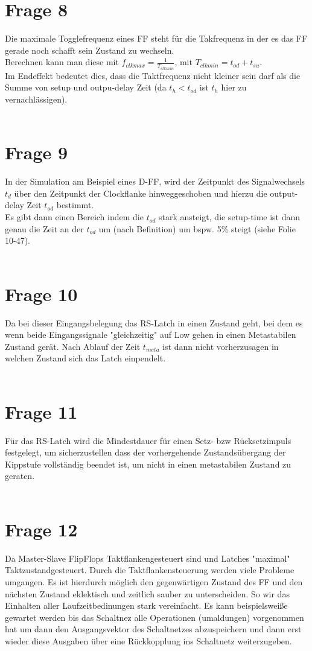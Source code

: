 \documentclass[a4paper]{scrartcl}
\begin{document}
\section*{Frage 8}
Die maximale Togglefrequenz eines FF steht für die Takfrequenz in der es das FF gerade noch schafft sein Zustand zu wechseln.\\
Berechnen kann man diese mit $f_{clkmax} = \frac{1}{T_{clkmin}} \text{, mit }T_{clkmin} = t_{od} + t_{su}$.\\
Im Endeffekt bedeutet dies, dass die Taktfrequenz nicht kleiner sein darf als die Summe von setup und outpu-delay Zeit (da $t_{h} < t_{od}$ ist $t_h$ hier zu vernachlässigen). 
~\\
~\\
\section*{Frage 9}
In der Simulation am Beispiel eines D-FF, wird der Zeitpunkt des Signalwechsels $t_d$ über den Zeitpunkt der Clockflanke hinweggeschoben und hierzu die output-delay Zeit $t_{od}$ bestimmt.\\
Es gibt dann einen Bereich indem die $t_{od}$ stark ansteigt, die setup-time ist dann genau die Zeit an der $t_{od}$ um (nach Befinition) um bspw. 5\% steigt (siehe Folie 10-47).
~\\
~\\
\section*{Frage 10}
Da bei dieser Eingangsbelegung das RS-Latch in einen Zustand geht, bei dem es wenn beide Eingangssignale "gleichzeitig" auf Low gehen in einen Metastabilen Zustand gerät. Nach Ablauf der Zeit $t_{meta}$ ist dann nicht vorherzusagen in welchen Zustand sich das Latch einpendelt.
~\\
~\\
\section*{Frage 11}
Für das RS-Latch wird die Mindestdauer für einen Setz- bzw Rücksetzimpuls festgelegt, um sicherzustellen dass der vorhergehende Zustandsübergang der Kippstufe vollständig beendet ist, um nicht in einen metastabilen Zustand zu geraten.
~\\
~\\
\section*{Frage 12}
Da Master-Slave FlipFlops Taktflankengesteuert sind und Latches "maximal" Taktzustandgesteuert. Durch die Taktflankensteuerung werden viele Probleme umgangen. Es ist hierdurch möglich den gegenwärtigen Zustand des FF und den nächsten Zustand eklektisch und zeitlich sauber zu unterscheiden. So wir das Einhalten aller Laufzeitbedinungen stark vereinfacht. Es kann beispielsweiße gewartet werden bis das Schaltnez alle Operationen (umaldungen) vorgenommen hat um dann den Ausgangsvektor des Schaltnetzes abzuspeichern und dann erst wieder diese Ausgaben über eine Rückkopplung ins Schaltnetz weiterzugeben.
~\\
~\\
\end{document}
